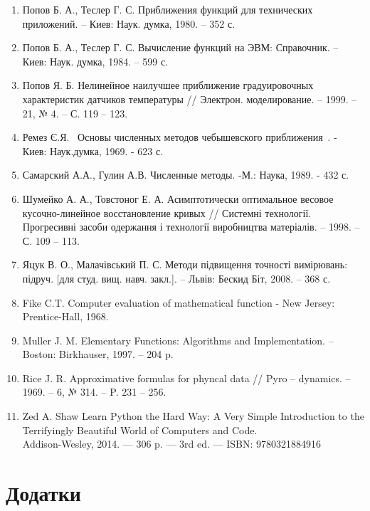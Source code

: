 \documentclass[ukrainian,14pt]{extarticle}
\begin{document}
\begin{enumerate}
\item Попов Б. А., Теслер Г. С. Приближения функций для технических
приложений. – Киев: Наук. думка, 1980. – 352 с.

\item Попов Б. А., Теслер Г. С. Вычисление функций на ЭВМ: Справочник. –
Киев: Наук. думка, 1984. – 599 с.

\item Попов Я. Б. Нелинейное наилучшее приближение градуировочных
характеристик датчиков температуры // Электрон. моделирование. –
1999. – 21, № 4. – С. 119 – 123.

\item Ремез Є.Я.  Основы численных методов чебышевского приближения . -
Киев: Наук.думка, 1969. - 623 с.

\item Самарский А.А., Гулин А.В. Численные методы. -М.: Наука, 1989. - 432 с.

\item Шумейко А. А., Товстоног Е. А. Асимптотически оптимальное весовое
кусочно-линейное восстановление кривых // Системні технології.
Прогресивні засоби одержання і технології виробництва матеріалів. –
1998. – С. 109 – 113.

\item Яцук В. О., Малачівський П. С. Методи підвищення точності
вимірювань: підруч. [для студ. вищ. навч. закл.]. – Львів: Бескид Біт, 2008. –
368 с.

\item Fike C.T. Computer evaluation of mathematical function - New Jersey: Prentice-Hall, 1968.

\item Muller J. M. Elementary Functions: Algorithms and Implementation. –
Boston: Birkhauser, 1997. – 204 p.

\item Rice J. R. Approximative formulas for phyncal data // Pyro – dynamics. –
1969. – 6, № 314. – P. 231 – 256.

\item Zed A. Shaw Learn Python the Hard Way: A Very Simple Introduction to the Terrifyingly Beautiful World of Computers and Code. \\
Addison-Wesley, 2014. — 306 p. — 3rd ed. — ISBN: 9780321884916
\end{enumerate}

\newpage

\section*{Додатки}
\end{document}
